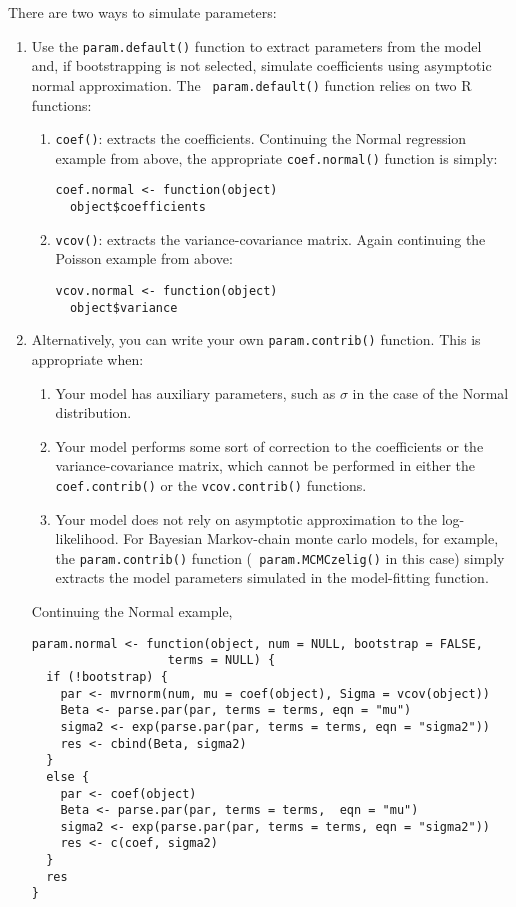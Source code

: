 There are two ways to simulate parameters:
\begin{enumerate}
  
\item Use the {\tt param.default()} function to extract parameters
  from the model and, if bootstrapping is not selected, simulate
  coefficients using asymptotic normal approximation.  The {\tt
    param.default()} function relies on two R functions:

  \begin{enumerate}
  \item {\tt coef()}: extracts the coefficients.  Continuing the
    Normal regression example from above, the appropriate {\tt coef.normal()}
    function is simply:
\begin{verbatim}
coef.normal <- function(object)
  object$coefficients
\end{verbatim}
  \item {\tt vcov()}: extracts the variance-covariance matrix.  Again
    continuing the Poisson example from above:
\begin{verbatim}
vcov.normal <- function(object)
  object$variance
\end{verbatim}
\end{enumerate}

\item Alternatively, you can write your own {\tt param.contrib()}
  function.  This is appropriate when:  
  \begin{enumerate}
  \item Your model has auxiliary parameters, such as $\sigma$ in the
    case of the Normal distribution.
  \item Your model performs some sort of correction to the coefficients
    or the variance-covariance matrix, which cannot be performed in
    either the {\tt coef.contrib()} or the {\tt vcov.contrib()}
    functions.
  \item Your model does not rely on asymptotic approximation to the
    log-likelihood.  For Bayesian Markov-chain monte carlo models, for
    example, the {\tt param.contrib()} function ({\tt
      param.MCMCzelig()} in this case) simply extracts the model
    parameters simulated in the model-fitting function.
  \end{enumerate}
  Continuing the Normal example, 
\begin{verbatim}
param.normal <- function(object, num = NULL, bootstrap = FALSE, 
                   terms = NULL) {
  if (!bootstrap) {
    par <- mvrnorm(num, mu = coef(object), Sigma = vcov(object))
    Beta <- parse.par(par, terms = terms, eqn = "mu")
    sigma2 <- exp(parse.par(par, terms = terms, eqn = "sigma2"))
    res <- cbind(Beta, sigma2)
  }
  else {
    par <- coef(object)
    Beta <- parse.par(par, terms = terms,  eqn = "mu")
    sigma2 <- exp(parse.par(par, terms = terms, eqn = "sigma2"))
    res <- c(coef, sigma2)
  }
  res
}
\end{verbatim}
\end{enumerate}

